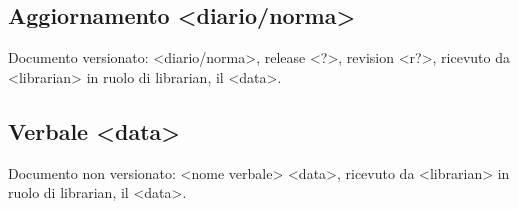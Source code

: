 \subsection{Aggiornamento <diario/norma>}
Documento versionato: <diario/norma>, release <?>, revision <r?>, ricevuto da 
<librarian> in ruolo di librarian, il <data>. 

\subsection{Verbale <data>}
Documento non versionato: <nome verbale> <data>, ricevuto da <librarian> 
in ruolo di librarian, il <data>. 
